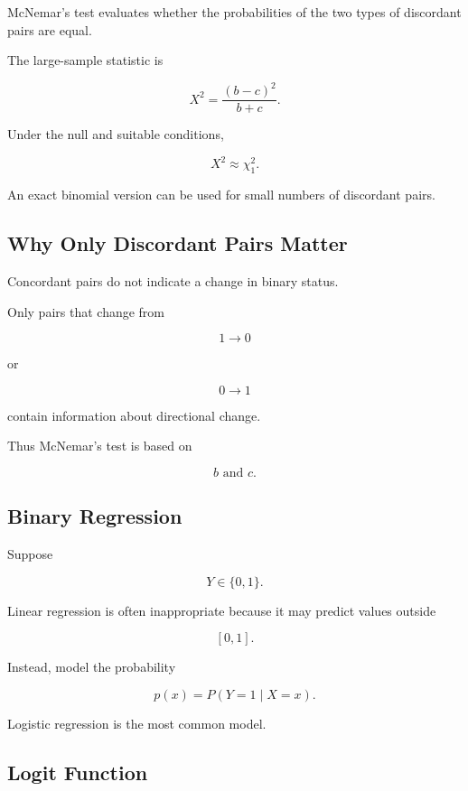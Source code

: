 McNemar's test evaluates whether the probabilities of the two types of
discordant pairs are equal.

The large-sample statistic is

\[
\boxed{
X^2
=
\frac{
(b-c)^2
}{
b+c
}.
}
\]

Under the null and suitable conditions,

\[
\boxed{
X^2
\approx
\chi^2_1.
}
\]

An exact binomial version can be used for small numbers of discordant
pairs.

\subsection{Why Only Discordant Pairs Matter}
\label{subsec:discordant-pairs}

Concordant pairs do not indicate a change in binary status.

Only pairs that change from

\[
1\to0
\]

or

\[
0\to1
\]

contain information about directional change.

Thus McNemar's test is based on

\[
\boxed{
b
\text{ and }
c.
}
\]

\subsection{Binary Regression}
\label{subsec:binary-regression}

Suppose

\[
Y\in\{0,1\}.
\]

Linear regression is often inappropriate because it may predict values
outside

\[
[0,1].
\]

Instead, model the probability

\[
\boxed{
p(x)
=
P(Y=1\mid X=x).
}
\]

Logistic regression is the most common model.

\subsection{Logit Function}
\label{subsec:logit-function}

